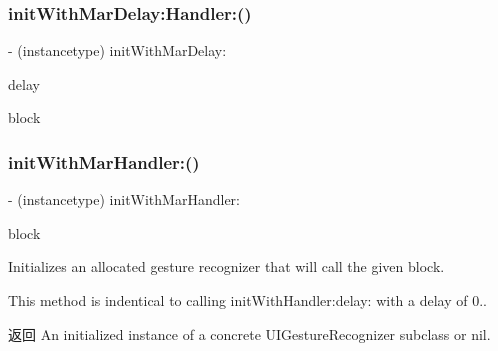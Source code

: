 \subsubsection{\texorpdfstring{init\+With\+Mar\+Delay\+:\+Handler\+:()}{initWithMarDelay:Handler:()}\hspace{0.1cm}{\footnotesize\ttfamily [2/2]}}
{\footnotesize\ttfamily -\/ (instancetype) init\+With\+Mar\+Delay\+: \begin{DoxyParamCaption}\item[{(N\+S\+Time\+Interval)}]{delay }\item[{Handler:(void($^\wedge$)(U\+I\+Gesture\+Recognizer $\ast$ \+\_\+\+Nonnull, U\+I\+Gesture\+Recognizer\+State, C\+G\+Point))}]{block }\end{DoxyParamCaption}\hspace{0.3cm}{\ttfamily [implementation]}}

\mbox{\label{category_u_i_gesture_recognizer_07_m_a_r_e_x___block_08_a229beb62690f366a1f988ea1b3d5db69}} 
\subsubsection{\texorpdfstring{init\+With\+Mar\+Handler\+:()}{initWithMarHandler:()}\hspace{0.1cm}{\footnotesize\ttfamily [1/2]}}
{\footnotesize\ttfamily -\/ (instancetype) init\+With\+Mar\+Handler\+: \begin{DoxyParamCaption}\item[{(void($^\wedge$)(U\+I\+Gesture\+Recognizer $\ast$sender, U\+I\+Gesture\+Recognizer\+State state, C\+G\+Point location))}]{block }\end{DoxyParamCaption}}

Initializes an allocated gesture recognizer that will call the given block.

This method is indentical to calling init\+With\+Handler\+:delay\+: with a delay of 0..

\begin{DoxyReturn}{返回}
An initialized instance of a concrete U\+I\+Gesture\+Recognizer subclass or {\ttfamily nil}. 
\end{DoxyReturn}

